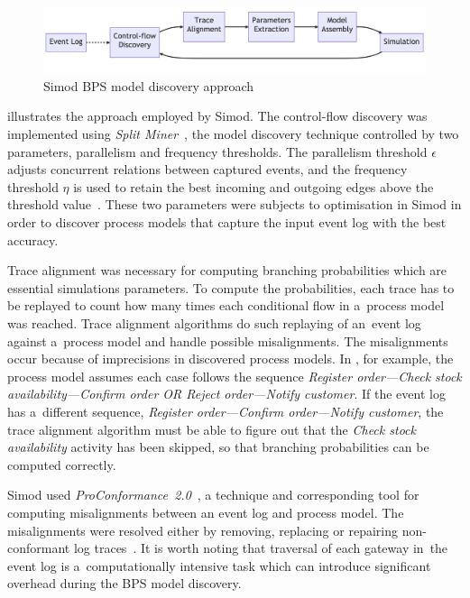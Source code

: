 \documentclass[12pt]{article}
\begin{document}
\begin{figure}
    \centering
    \includegraphics[width=\textwidth]{figures/Simod.png}
    \caption{Simod BPS model discovery approach~\cite{camargo_automated_2020}}
    \label{fig:simod}
\end{figure}

 illustrates the approach employed by Simod. The control-flow discovery was implemented using \emph{Split Miner}~\cite{augusto_split_2019}, the model discovery technique controlled by two parameters, parallelism and frequency thresholds. The parallelism threshold $\epsilon$ adjusts concurrent relations between captured events, and the frequency threshold $\eta$ is used to retain the best incoming and outgoing edges above the threshold value~\cite{camargo_automated_2020}. These two parameters were subjects to optimisation in Simod in order to discover process models that capture the input event log with the best accuracy.

Trace alignment was necessary for computing branching probabilities which are essential simulations parameters.
To compute the probabilities, each trace has to be replayed to count how many times each conditional flow in a~process model was reached.
Trace alignment algorithms do such replaying of an~event log against a~process model and handle possible misalignments.
The misalignments occur because of imprecisions in discovered process models.
In , for example, the process model assumes each case follows the sequence \emph{Register order---Check stock availability---Confirm order OR Reject order---Notify customer}.
If the event log has a~different sequence, \emph{Register order---Confirm order---Notify customer}, the trace alignment algorithm must be able to figure out that the \emph{Check stock availability} activity has been skipped, so that branching probabilities can be computed correctly.

Simod used \emph{ProConformance~2.0}~\cite{reisner_scalable_2017}, a technique and corresponding tool for computing misalignments between an event log and process model.
The misalignments were resolved either by removing, replacing or repairing non-conformant log traces~\cite{camargo_automated_2020}.
It is worth noting that traversal of each gateway in~the event log is a~computationally intensive task which can introduce significant overhead during the BPS model discovery.
\end{document}
